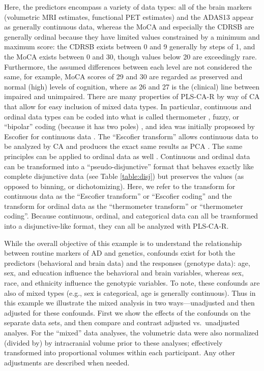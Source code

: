 \documentclass[12pt]{article}
\begin{document}
Here, the predictors encompass a variety of data types: all of the brain
markers (volumetric MRI estimates, functional PET estimates) and the
ADAS13 appear as generally continuous data, whereas the MoCA and
especially the CDRSB are generally ordinal because they have limited
values constrained by a minimum and maximum score: the CDRSB exists
between 0 and 9 generally by steps of 1, and the MoCA exists between 0
and 30, though values below 20 are exceedingly rare. Furthermore, the
assumed differences between each level are not considered the same, for
example, MoCA scores of 29 and 30 are regarded as preserved and normal
(high) levels of cognition, where as 26 and 27 is the (clinical) line
between impaired and unimpaired. There are many properties of PLS-CA-R
by way of CA that allow for easy inclusion of mixed data types. In
particular, continuous and ordinal data types can be coded into what is
called thermometer \citep{beaton2018generalization}, fuzzy, or
``bipolar'' coding (because it has two poles) \citep{greenacrefuzzy},
and idea was initially propsosed by Escofier for continuous data
\citep{escofier_traitement_1979}. The ``Escofier transform'' allows
continuous data to be analyzed by CA and produces the exact same results
as PCA \citep{escofier_traitement_1979}. The same principles can be
applied to ordinal data as well \citep{beaton2018generalization}.
Continuous and ordinal data can be transformed into a
``pseudo-disjunctive'' format that behaves exactly like complete
disjunctive data (see Table \ref{table:disj}) but preserves the values
(as opposed to binning, or dichotomizing). Here, we refer to the
transform for continuous data as the ``Escofier transform'' or
``Escofier coding'' \citep{beaton_partial_2016} and the transform for
ordinal data as the ``thermometer transform'' or ``thermometer coding''.
Because continuous, ordinal, and categorical data can all be trasnformed
into a disjunctive-like format, they can all be analyzed with PLS-CA-R.

While the overall objective of this example is to understand the
relationship between routine markers of AD and genetics, confounds exist
for both the predictors (behavioral and brain data) and the responses
(genotype data): age, sex, and education influence the behavioral and
brain variables, whereas sex, race, and ethnicity influence the
genotypic variables. To note, these confounds are also of mixed types
(e.g., sex is categorical, age is generally continuous). Thus in this
example we illustrate the mixed analysis in two ways---unadjusted and
then adjusted for these confounds. First we show the effects of the
confounds on the separate data sets, and then compare and contrast
adjusted vs.~unadjusted analyes. For the ``mixed'' data analyses, the
volumetric data were also normalized (divided by) by intracranial volume
prior to these analyses; effectively transformed into proportional
volumes within each participant. Any other adjustments are described
when needed.
\end{document}
